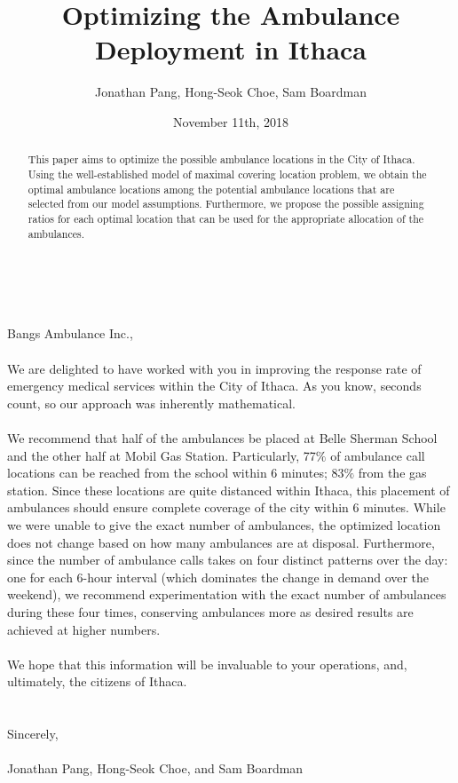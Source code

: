 \documentclass{article}
\title{Optimizing the Ambulance Deployment in Ithaca}
\author{Jonathan Pang, Hong-Seok Choe, Sam Boardman}
\date{November 11th, 2018}
\begin{document}
\maketitle

\begin{abstract}
This paper aims to optimize the possible ambulance locations in the City of Ithaca. Using the well-established model of maximal covering location problem, we obtain the optimal ambulance locations among the potential ambulance locations that are selected from our model assumptions. Furthermore, we propose the possible assigning ratios for each optimal location that can be used for the appropriate allocation of the ambulances.
\end{abstract}
\newpage
\tableofcontents
\newpage
\noindent
\\ \\
Bangs Ambulance Inc., \\ \\
We are delighted to have worked with you in improving the response rate of emergency medical services within the City of Ithaca. As you know, seconds count, so our approach was inherently mathematical. \\ \\
We recommend that half of the ambulances be placed at Belle Sherman School and the other half at Mobil Gas Station. Particularly, 77$\%$ of ambulance call locations can be reached from the school within 6 minutes; 83$\%$ from the gas station. Since these locations are quite distanced within Ithaca, this placement of ambulances should ensure complete coverage of the city within 6 minutes. While we were unable to give the exact number of ambulances, the optimized location does not change based on how many ambulances are at disposal. Furthermore, since the number of ambulance calls takes on four distinct patterns over the day: one for each 6-hour interval (which dominates the change in demand over the weekend), we recommend experimentation with the exact number of ambulances during these four times, conserving ambulances more as desired results are achieved at higher numbers. \\ \\
We hope that this information will be invaluable to your operations, and, ultimately, the citizens of Ithaca.\\ \\ \\
Sincerely,\\ \\
Jonathan Pang, Hong-Seok Choe, and Sam Boardman 
\newpage
\end{document}
